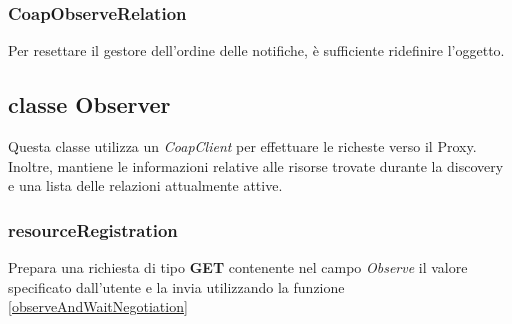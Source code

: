 			\subsubsection{CoapObserveRelation}
				Per resettare il gestore dell'ordine delle notifiche, è sufficiente ridefinire l'oggetto.\newline
				
		\subsection{classe Observer}
			Questa classe utilizza un \textit{CoapClient} per effettuare le richeste verso il Proxy. Inoltre, mantiene le informazioni relative alle risorse trovate durante la discovery e una lista delle relazioni attualmente attive.
			\subsubsection{resourceRegistration}
				Prepara una richiesta di tipo \textbf{GET} contenente nel campo \textit{Observe} il valore specificato dall'utente e la invia utilizzando la funzione \ref{observeAndWaitNegotiation}
